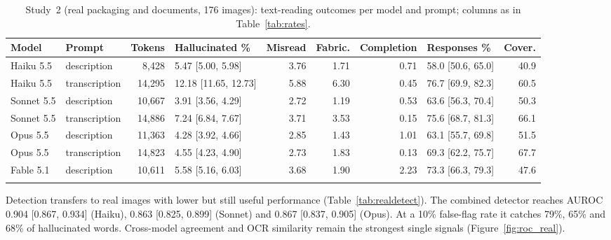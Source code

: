 \documentclass[pdflatex,sn-mathphys-num]{sn-jnl}%
\theoremstyle{thmstyleone}%
\theoremstyle{thmstyletwo}%
\theoremstyle{thmstylethree}%
\newcommand{\RealAucCombCIHaiku}{0.904 [0.867, 0.934]}
\newcommand{\RealAucCombCIOpus}{0.867 [0.837, 0.905]}
\newcommand{\RealAucCombCISonnet}{0.863 [0.825, 0.899]}
\newcommand{\RealNImages}{176}
\newcommand{\RealRecTenHaiku}{79}
\newcommand{\RealRecTenOpus}{68}
\newcommand{\RealRecTenSonnet}{65}
\begin{document}
\begin{table}[!htbp]
\caption{Study~2 (real packaging and documents, \RealNImages{} images): text-reading outcomes per model and prompt; columns as in Table~\ref{tab:rates}.}\label{tab:realrates}
\footnotesize
\setlength{\tabcolsep}{3pt}
\begin{tabular*}{\textwidth}{@{\extracolsep\fill}llrlrrrlr}
\toprule
Model & Prompt & Tokens & Hallucinated \% & Misread & Fabric. & Completion & Responses \% & Cover. \\
\midrule
Haiku 5.5 & description & 8{,}428 & 5.47 [5.00{,} 5.98] & 3.76 & 1.71 & 0.71 & 58.0 [50.6{,} 65.0] & 40.9 \\
Haiku 5.5 & transcription & 14{,}295 & 12.18 [11.65{,} 12.73] & 5.88 & 6.30 & 0.45 & 76.7 [69.9{,} 82.3] & 60.5 \\
Sonnet 5.5 & description & 10{,}667 & 3.91 [3.56{,} 4.29] & 2.72 & 1.19 & 0.53 & 63.6 [56.3{,} 70.4] & 50.3 \\
Sonnet 5.5 & transcription & 14{,}886 & 7.24 [6.84{,} 7.67] & 3.71 & 3.53 & 0.15 & 75.6 [68.7{,} 81.3] & 66.1 \\
Opus 5.5 & description & 11{,}363 & 4.28 [3.92{,} 4.66] & 2.85 & 1.43 & 1.01 & 63.1 [55.7{,} 69.8] & 51.5 \\
Opus 5.5 & transcription & 14{,}823 & 4.55 [4.23{,} 4.90] & 2.73 & 1.83 & 0.13 & 69.3 [62.2{,} 75.7] & 67.7 \\
Fable 5.1 & description & 10{,}611 & 5.58 [5.16{,} 6.03] & 3.68 & 1.90 & 2.23 & 73.3 [66.3{,} 79.3] & 47.6 \\
\botrule
\end{tabular*}
\end{table}

Detection transfers to real images with lower but still useful performance (Table~\ref{tab:realdetect}). The combined detector reaches AUROC \RealAucCombCIHaiku{} (Haiku), \RealAucCombCISonnet{} (Sonnet) and \RealAucCombCIOpus{} (Opus). At a 10\% false-flag rate it catches \RealRecTenHaiku\%, \RealRecTenSonnet\% and \RealRecTenOpus\% of hallucinated words. Cross-model agreement and OCR similarity remain the strongest single signals (Figure~\ref{fig:roc_real}).
\end{document}

